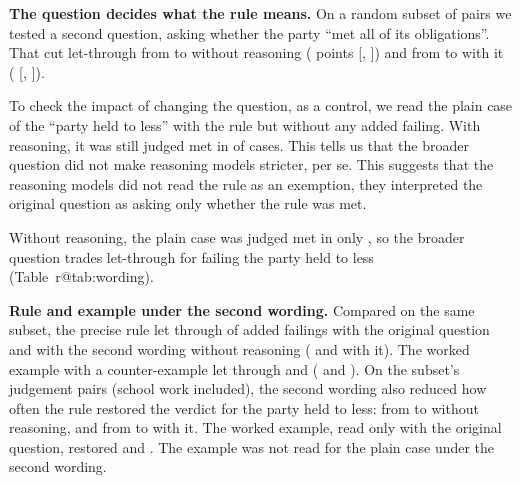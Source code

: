 \documentclass[11pt]{article}
\makeatletter
\DeclareRobustCommand\ref[1]{\ifcsname r@#1\endcsname\rjlocalref{#1}\else\rjlocalref*{X-#1}\fi}}
\makeatother
\begin{document}
\textbf{The question decides what the rule means.} On a random subset of \SecondWordingPairs{} pairs we tested a
second question, asking whether the party ``met all of its obligations''. That cut let-through from
\SecondWordingRuleOriginalNoReasoning{} to \SecondWordingRuleNewNoReasoning{} without reasoning
(\SecondWordingRuleChangeNoReasoning{} points [\SecondWordingRuleChangeNoReasoningLo{},
\SecondWordingRuleChangeNoReasoningHi{}]) and from \SecondWordingRuleOriginalReasoning{} to
\SecondWordingRuleNewReasoning{} with it (\SecondWordingRuleChangeReasoning{} [\SecondWordingRuleChangeReasoningLo{},
\SecondWordingRuleChangeReasoningHi{}]).

To check the impact of changing the question, as a control, we read the plain case of the ``party held to less'' with the rule
but without any added failing. With reasoning, it was still judged met in \SecondWordingControlPlainMetReasoning{} of
cases. This tells us that the broader question did not make reasoning models stricter, per se. This suggests that the
reasoning models did not read the rule as an exemption, they interpreted the original question as asking only whether
the rule was met.

Without reasoning, the plain case was judged met in only \SecondWordingControlPlainMetNoReasoning{}, so the broader
question trades let-through for failing the party held to less (Table~\ref{tab:wording}).

\textbf{Rule and example under the second wording.} Compared on the same subset, the precise rule let through
\SecondWordingRuleOriginalNoReasoning{} of added failings with the original question and
\SecondWordingRuleNewNoReasoning{} with the second wording without reasoning (\SecondWordingRuleOriginalReasoning{} and
\SecondWordingRuleNewReasoning{} with it). The worked example with a counter-example let through
\SecondWordingExampleOriginalNoReasoning{} and \SecondWordingExampleNewNoReasoning{}
(\SecondWordingExampleOriginalReasoning{} and \SecondWordingExampleNewReasoning{}). On the subset's
\RestoredSubsetPairs{} judgement pairs (school work included), the second wording also reduced how often the rule restored the verdict for the
party held to less: from \RestoredRuleOriginalNoReasoning{} to \RestoredRuleNewNoReasoning{} without reasoning, and
from \RestoredRuleOriginalReasoning{} to \RestoredRuleNewReasoning{} with it. The worked example, read only with the
original question, restored \RestoredExampleOriginalNoReasoning{} and \RestoredExampleOriginalReasoning{}. The example
was not read for the plain case under the second wording.
\end{document}
